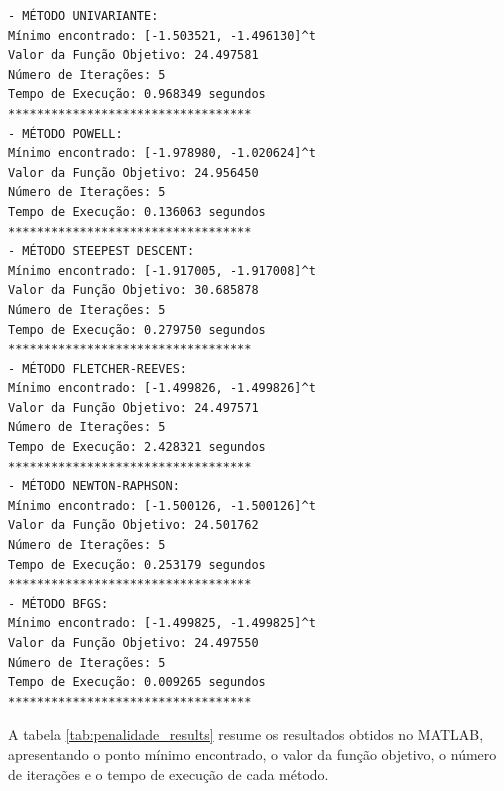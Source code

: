 \documentclass[a4paper, 12pt]{article}
\begin{document}
\begin{verbatim}
- MÉTODO UNIVARIANTE:
Mínimo encontrado: [-1.503521, -1.496130]^t
Valor da Função Objetivo: 24.497581
Número de Iterações: 5
Tempo de Execução: 0.968349 segundos
**********************************
- MÉTODO POWELL:
Mínimo encontrado: [-1.978980, -1.020624]^t
Valor da Função Objetivo: 24.956450
Número de Iterações: 5
Tempo de Execução: 0.136063 segundos
**********************************
- MÉTODO STEEPEST DESCENT:
Mínimo encontrado: [-1.917005, -1.917008]^t
Valor da Função Objetivo: 30.685878
Número de Iterações: 5
Tempo de Execução: 0.279750 segundos
**********************************
- MÉTODO FLETCHER-REEVES:
Mínimo encontrado: [-1.499826, -1.499826]^t
Valor da Função Objetivo: 24.497571
Número de Iterações: 5
Tempo de Execução: 2.428321 segundos
**********************************
- MÉTODO NEWTON-RAPHSON:
Mínimo encontrado: [-1.500126, -1.500126]^t
Valor da Função Objetivo: 24.501762
Número de Iterações: 5
Tempo de Execução: 0.253179 segundos
**********************************
- MÉTODO BFGS:
Mínimo encontrado: [-1.499825, -1.499825]^t
Valor da Função Objetivo: 24.497550
Número de Iterações: 5
Tempo de Execução: 0.009265 segundos
**********************************
\end{verbatim}




A tabela \ref{tab:penalidade_results} resume os resultados obtidos no MATLAB, apresentando o ponto mínimo encontrado, o valor da função objetivo, o número de iterações e o tempo de execução de cada método.

\begin{table}[h!]
    \centering
    \caption{Resultados dos Métodos OSR para o Método de Penalidade}
    \label{tab:penalidade_results}
\end{table}
\end{document}

